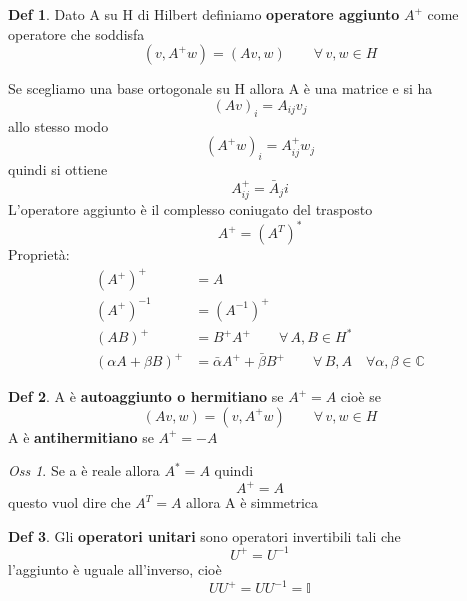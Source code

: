 \documentclass[a4paper,11pt]{report}
\theoremstyle{remark}
\newtheorem*{oss}{Oss}
\theoremstyle{definition}
\newtheorem*{Def}{Def}
\newcommand{\C}{\mathbb{C}}
\begin{document}
\begin{Def}
	Dato A su H di Hilbert definiamo \textbf{operatore aggiunto} $A^+$ come operatore che soddisfa 
	\begin{equation*}
		(v,A^+w)= (Av,w) \qquad \forall \, v,w \in H
	\end{equation*}
\end{Def}

\noindent Se scegliamo una base ortogonale su H allora A è una matrice e si ha 
\begin{equation*}
	(Av)_i = A_{ij}v_j
\end{equation*}
allo stesso modo
\begin{equation*}
	{(A^+w)}_i = A^+_{ij}w_j
\end{equation*}
quindi si ottiene
\begin{equation*}
	A^+_{ij} = \bar{A}_ji
\end{equation*}
L'operatore aggiunto è il complesso coniugato del trasposto
\begin{equation*}
	A^+ = {(A^T)}^*
\end{equation*}
Proprietà:
\begin{align*}
	{(A^+)}^+ &= A \\
	{(A^+)}^{-1} &= {(A^{-1})}^+ \\
	{(AB)}^+ &= B^+A^+ \qquad \forall \, A,B \in H^* \\
	{(\alpha A + \beta B)}^+ &= \bar{\alpha}A^+ + \bar{\beta}B^+ \qquad \forall \, B,A \quad \forall \alpha,\beta \in \C
\end{align*}

\begin{Def}
	A è \textbf{autoaggiunto o hermitiano} se $A^+=A$ cioè se 
	\begin{equation*}
		(Av,w) = (v,A^+w ) \qquad \forall \, v,w \in H
	\end{equation*}
	A è \textbf{antihermitiano} se $A^+ = -A$
\end{Def}

\begin{oss}
	Se a è reale allora $A^*=A$ quindi
	\begin{equation*}
		A^+ = A
	\end{equation*}
	questo vuol dire che $A^T = A$ allora A è simmetrica
\end{oss}

\begin{Def}
	Gli \textbf{operatori unitari} sono operatori invertibili tali che 
	\begin{equation*}
		U^+ = U^{-1}
	\end{equation*}
	l'aggiunto è uguale all'inverso, cioè
	\begin{equation*}
		UU^+ = UU^{-1} = \mathbb{I}
	\end{equation*}
\end{Def}
\end{document}
